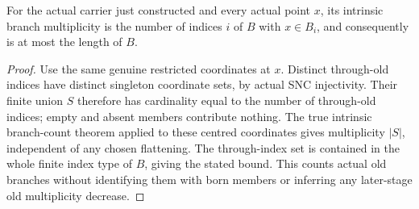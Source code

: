 \begin{theorem}
\label{hir:nc-snc-old-block-intrinsic-count}
\leanok
For the actual carrier just constructed and every actual point $x$,
its intrinsic branch multiplicity is the number of indices $i$ of $B$ with
$x\in B_i$, and consequently is at most the length of $B$.
\end{theorem}
\begin{proof}
Use the same genuine restricted coordinates at $x$. Distinct through-old
indices have distinct singleton coordinate sets, by actual SNC injectivity.
Their finite union $S$ therefore has cardinality equal to the number of
through-old indices; empty and absent members contribute nothing. The true
intrinsic branch-count theorem applied to these centred coordinates gives
multiplicity $|S|$, independent of any chosen flattening. The through-index
set is contained in the whole finite index type of $B$, giving the stated
bound. This counts actual old branches without identifying them with born
members or inferring any later-stage old multiplicity decrease.
\end{proof}

